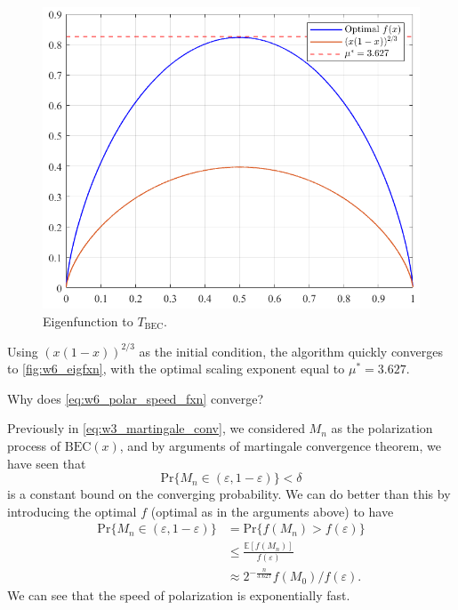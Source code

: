 \begin{figure}[H]
    \centering
    \includegraphics[width=0.6\linewidth]{figures/w6_polarization.png}
    \caption{Eigenfunction to $T_\mathrm{BEC}$.}
    \label{fig:w6_eigfxn}
\end{figure}

Using $(x(1-x))^{2/3}$ as the initial condition, the algorithm quickly converges to \autoref{fig:w6_eigfxn}, with the optimal scaling exponent equal to $\mu^*=3.627$.

\begin{remark}
    Why does \autoref{eq:w6_polar_speed_fxn} converge?
\end{remark}

Previously in \autoref{eq:w3_martingale_conv}, we considered $M_n$ as the polarization process of $\mathrm{BEC}(x)$, and by arguments of martingale convergence theorem, we have seen that
\begin{equation*}
    \mathrm{Pr}\{M_n\in(\varepsilon,1-\varepsilon)\} < \delta
\end{equation*}
is a constant bound on the converging probability. We can do better than this by introducing the optimal $f$ (optimal as in the arguments above) to have
\begin{align*}
    \mathrm{Pr}\{M_n\in(\varepsilon,1-\varepsilon)\} &= \mathrm{Pr}\{f(M_n) > f(\varepsilon)\} \\
    &\le \frac{\mathbb{E}[f(M_n)]}{f(\varepsilon)} \\
    &\approx 2^{-\frac{n}{3.627}} f(M_0) / f(\varepsilon).
\end{align*}
We can see that the speed of polarization is exponentially fast.

